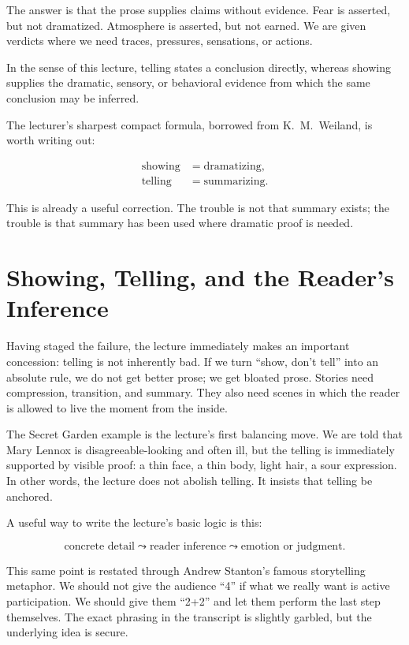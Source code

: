 The answer is that the prose supplies claims without evidence. Fear is asserted, but not dramatized. Atmosphere is asserted, but not earned. We are given verdicts where we need traces, pressures, sensations, or actions.

\begin{definition}
In the sense of this lecture, telling states a conclusion directly, whereas showing supplies the dramatic, sensory, or behavioral evidence from which the same conclusion may be inferred.
\end{definition}

The lecturer's sharpest compact formula, borrowed from K.\ M.\ Weiland, is worth writing out:

\begin{align}
\text{showing} &= \text{dramatizing},\\
\text{telling} &= \text{summarizing}.
\end{align}

This is already a useful correction. The trouble is not that summary exists; the trouble is that summary has been used where dramatic proof is needed.

\section{Showing, Telling, and the Reader's Inference}

Having staged the failure, the lecture immediately makes an important concession: telling is not inherently bad. If we turn ``show, don't tell'' into an absolute rule, we do not get better prose; we get bloated prose. Stories need compression, transition, and summary. They also need scenes in which the reader is allowed to live the moment from the inside.

The Secret Garden example is the lecture's first balancing move. We are told that Mary Lennox is disagreeable-looking and often ill, but the telling is immediately supported by visible proof: a thin face, a thin body, light hair, a sour expression. In other words, the lecture does not abolish telling. It insists that telling be anchored.

A useful way to write the lecture's basic logic is this:

\begin{equation}
\text{concrete detail} \leadsto \text{reader inference} \leadsto \text{emotion or judgment}.
\end{equation}

This same point is restated through Andrew Stanton's famous storytelling metaphor. We should not give the audience ``4'' if what we really want is active participation. We should give them ``2+2'' and let them perform the last step themselves. The exact phrasing in the transcript is slightly garbled, but the underlying idea is secure.

